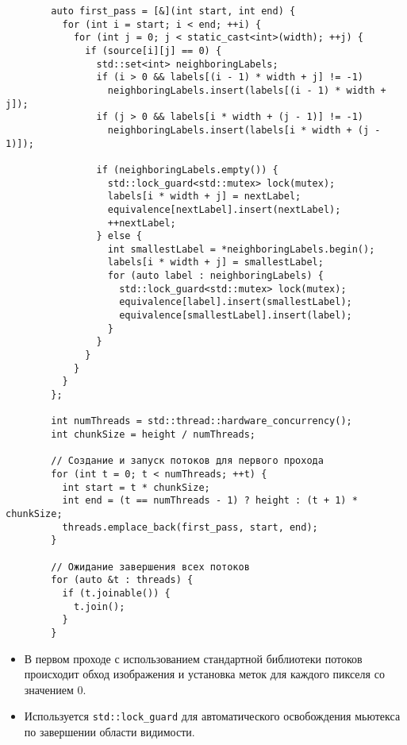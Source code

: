 \documentclass[a4paper, 14pt]{article}
\begin{document}
        \begin{verbatim}
        auto first_pass = [&](int start, int end) {
          for (int i = start; i < end; ++i) {
            for (int j = 0; j < static_cast<int>(width); ++j) {
              if (source[i][j] == 0) {
                std::set<int> neighboringLabels;
                if (i > 0 && labels[(i - 1) * width + j] != -1)
                  neighboringLabels.insert(labels[(i - 1) * width + j]);
                if (j > 0 && labels[i * width + (j - 1)] != -1)
                  neighboringLabels.insert(labels[i * width + (j - 1)]);
        
                if (neighboringLabels.empty()) {
                  std::lock_guard<std::mutex> lock(mutex);
                  labels[i * width + j] = nextLabel;
                  equivalence[nextLabel].insert(nextLabel);
                  ++nextLabel;
                } else {
                  int smallestLabel = *neighboringLabels.begin();
                  labels[i * width + j] = smallestLabel;
                  for (auto label : neighboringLabels) {
                    std::lock_guard<std::mutex> lock(mutex);
                    equivalence[label].insert(smallestLabel);
                    equivalence[smallestLabel].insert(label);
                  }
                }
              }
            }
          }
        };
        
        int numThreads = std::thread::hardware_concurrency();
        int chunkSize = height / numThreads;
        
        // Создание и запуск потоков для первого прохода
        for (int t = 0; t < numThreads; ++t) {
          int start = t * chunkSize;
          int end = (t == numThreads - 1) ? height : (t + 1) * chunkSize;
          threads.emplace_back(first_pass, start, end);
        }
        
        // Ожидание завершения всех потоков
        for (auto &t : threads) {
          if (t.joinable()) {
            t.join();
          }
        }
        \end{verbatim}
        
        \begin{itemize}
          \item В первом проходе с использованием стандартной библиотеки потоков происходит обход изображения и установка меток для каждого пикселя со значением 0.
          \item Используется \texttt{std::lock\_guard} для автоматического освобождения мьютекса по завершении области видимости.
        \end{itemize}
        
\end{document}
